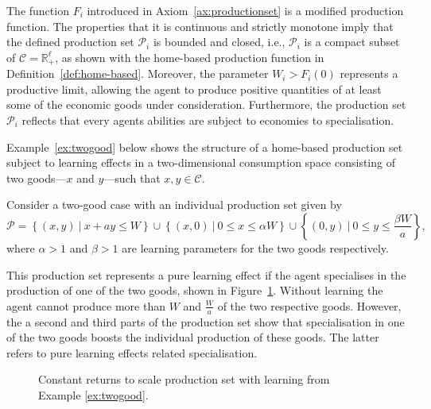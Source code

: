 The function $F_i$ introduced in Axiom~\ref{ax:productionset} is a modified production function. The properties that it is continuous and strictly monotone imply that the defined production set $\mathcal{P}_i$ is bounded and closed, i.e., $\mathcal{P}_i$ is a compact subset of $\mathcal{C} = \mathbb{R}_{+}^{\ell}$, as shown with the home-based production function in Definition~\ref{def:home-based}. Moreover, the parameter $W_{i} > F_{i}(0)$ represents a productive limit, allowing the agent to produce positive quantities of at least some of the economic goods under consideration. Furthermore, the production set $\mathcal{P}_i$ reflects that every agents abilities are subject to economies to specialisation.

Example~\ref{ex:twogood} below shows the structure of a home-based production set subject to learning effects in a two-dimensional consumption space consisting of two goods---$x$ and $y$---such that $x,y \in \mathcal{C}$.

\begin{example} \label{ex:twogood}
Consider a two-good case with an individual production set given by
\begin{equation}
\mathcal{P} = \left\{ (x,y) ~ | ~ x + ay \leqslant W \right\} \cup \left\{ (x,0) ~ | ~ 0 \leqslant x \leqslant \alpha W \right\} \cup \left\{ (0,y) ~ | ~ 0 \leqslant y \leqslant \frac{\beta W}{a} \right\} ,
\end{equation}
where $\alpha > 1$ and $\beta > 1$ are learning parameters for the two goods respectively.

This production set represents a pure learning effect if the agent specialises in the production of one of the two goods, shown in Figure~\ref{fig:production}. Without learning the agent cannot produce more than $W$ and $\frac{W}{a}$ of the two respective goods. However, the a second and third parts of the production set show that specialisation in one of the two goods boosts the individual production of these goods. The latter refers to pure learning effects related specialisation.
\end{example}

\begin{figure}[t]
\label{fig:production}
\begin{center}
\end{center}
\caption[Constant returns to scale production set with learning]{Constant returns to scale production set with learning from Example \ref{ex:twogood}.}
\end{figure}

